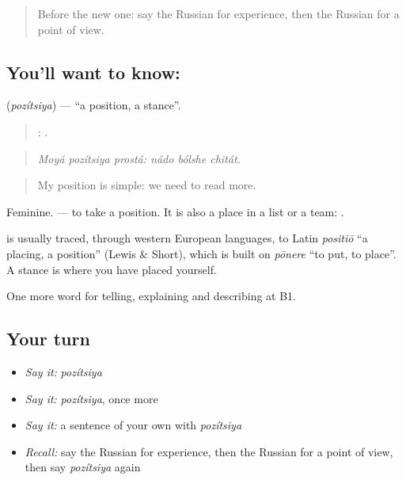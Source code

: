 \label{lesson:RU-C337-poziciya}



\begin{quote}
Before the new one: say the Russian for experience, then the Russian for a point of view.
\end{quote}

\subsection*{You'll want to know: }
\textbf{} (\emph{pozítsiya}) — \textquotedblleft{}a position, a stance\textquotedblright{}.

\begin{quote}
  :   .
\end{quote}

\begin{quote}
\emph{Moyá pozítsiya prostá: nádo bólshe chitát.}
\end{quote}

\begin{quote}
My position is simple: we need to read more.
\end{quote}

Feminine. \emph{ } — to take a position. It is also a place in a list or a team: \emph{ }.

\begin{cousinweb}
\textbf{} is usually traced, through western European languages, to Latin \emph{positiō} \textquotedblleft{}a placing, a position\textquotedblright{} (Lewis \& Short), which is built on \emph{pōnere} \textquotedblleft{}to put, to place\textquotedblright{}. A stance is where you have placed yourself.
\end{cousinweb}

\begin{grammarlens}[title={What you've built}]
One more word for telling, explaining and describing at B1.
\end{grammarlens}

\subsection*{Your turn}
\begin{itemize}
\raggedright
  \item \emph{Say it:} \emph{pozítsiya}
  \item \emph{Say it:} \emph{pozítsiya}, once more
  \item \emph{Say it:} a sentence of your own with \emph{pozítsiya}
  \item \emph{Recall:} say the Russian for experience, then the Russian for a point of view, then say \emph{pozítsiya} again
\end{itemize}

